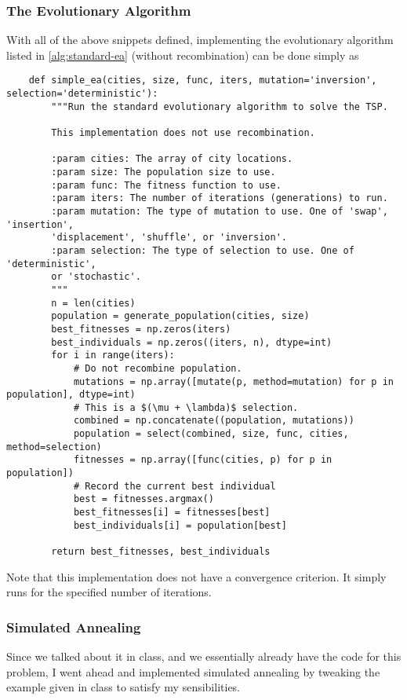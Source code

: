 \documentclass{article}
\begin{document}
\subsubsection{The Evolutionary Algorithm}
With all of the above snippets defined, implementing the evolutionary algorithm listed in
\autoref{alg:standard-ea} (without recombination) can be done simply as

\begin{verbatim}
    def simple_ea(cities, size, func, iters, mutation='inversion', selection='deterministic'):
        """Run the standard evolutionary algorithm to solve the TSP.

        This implementation does not use recombination.

        :param cities: The array of city locations.
        :param size: The population size to use.
        :param func: The fitness function to use.
        :param iters: The number of iterations (generations) to run.
        :param mutation: The type of mutation to use. One of 'swap', 'insertion',
        'displacement', 'shuffle', or 'inversion'.
        :param selection: The type of selection to use. One of 'deterministic',
        or 'stochastic'.
        """
        n = len(cities)
        population = generate_population(cities, size)
        best_fitnesses = np.zeros(iters)
        best_individuals = np.zeros((iters, n), dtype=int)
        for i in range(iters):
            # Do not recombine population.
            mutations = np.array([mutate(p, method=mutation) for p in population], dtype=int)
            # This is a $(\mu + \lambda)$ selection.
            combined = np.concatenate((population, mutations))
            population = select(combined, size, func, cities, method=selection)
            fitnesses = np.array([func(cities, p) for p in population])
            # Record the current best individual
            best = fitnesses.argmax()
            best_fitnesses[i] = fitnesses[best]
            best_individuals[i] = population[best]

        return best_fitnesses, best_individuals
\end{verbatim}

Note that this implementation does not have a convergence criterion. It simply runs for the
specified number of iterations.

\subsubsection{Simulated Annealing}
Since we talked about it in class, and we essentially already have the code for this problem, I
went ahead and implemented simulated annealing by tweaking the example given in class to satisfy my
sensibilities.
\end{document}

